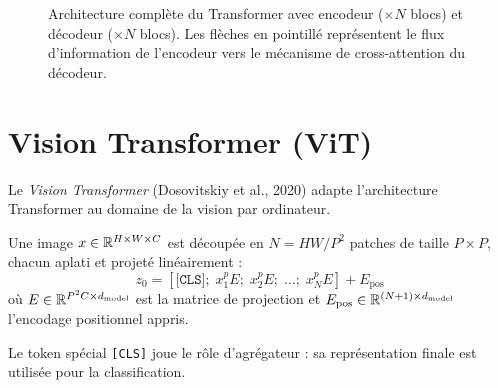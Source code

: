 \begin{figure}[htbp]
\caption{Architecture compl\`ete du Transformer avec encodeur ($\times N$ blocs) et d\'ecodeur ($\times N$ blocs). Les fl\`eches en pointill\'e repr\'esentent le flux d'information de l'encodeur vers le m\'ecanisme de cross-attention du d\'ecodeur.}
\label{fig:transformer-architecture}
\end{figure}

\section{Vision Transformer (ViT)}
\label{sec:vit}

Le \emph{Vision Transformer} (Dosovitskiy et al., 2020) adapte l'architecture Transformer au domaine de la vision par ordinateur.

\begin{definition}
Une image $x \in \mathbb{R}^{H \times W \times C}$ est d\'ecoup\'ee en $N = HW/P^2$ patches de taille $P \times P$, chacun aplati et projet\'e lin\'eairement :
\begin{equation}
z_0 = [\texttt{[CLS]};\; x_1^p E;\; x_2^p E;\; \ldots;\; x_N^p E] + E_{\text{pos}}
\end{equation}
o\`u $E \in \mathbb{R}^{P^2 C \times d_{\text{model}}}$ est la matrice de projection et $E_{\text{pos}} \in \mathbb{R}^{(N+1) \times d_{\text{model}}}$ l'encodage positionnel appris.
\end{definition}

\begin{remarque}
Le token sp\'ecial \texttt{[CLS]} joue le r\^ole d'agr\'egateur : sa repr\'esentation finale est utilis\'ee pour la classification.
\end{remarque}

